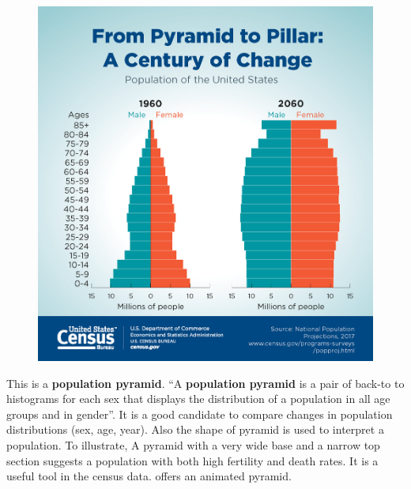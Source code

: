 \documentclass[]{book}
\theoremstyle{definition}
\theoremstyle{definition}
\theoremstyle{definition}
\theoremstyle{remark}
\begin{document}
\citep{population_pyramid}

\begin{figure}
\centering
\includegraphics{images/Pyramid.jpg}
\caption{}
\end{figure}

This is a \textbf{population pyramid}. ``A \textbf{population pyramid}
is a pair of back-to to histograms for each sex that displays the
distribution of a population in all age groups and in gender''. It is a
good candidate to compare changes in population distributions (sex, age,
year). Also the shape of pyramid is used to interpret a population. To
illustrate, A pyramid with a very wide base and a narrow top section
suggests a population with both high fertility and death rates. It is a
useful tool in the census data. \citep{animated_pyramid} offers an
animated pyramid.
\end{document}
